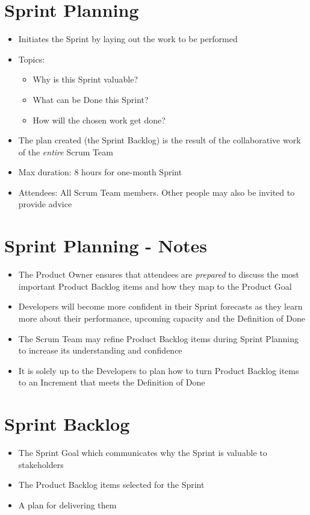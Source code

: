 \documentclass[a4paper,11pt,twocolumn]{article}
\begin{document}
\section*{Sprint Planning}
\begin{itemize}
	\item Initiates the Sprint by laying out the work to be performed
	\item Topics:
	      \begin{itemize}
	      	\item Why is this Sprint valuable?
	      	\item What can be Done this Sprint?
	      	\item How will the chosen work get done?
	      \end{itemize}
	\item The plan created (the Sprint Backlog) is the result of the collaborative work of the \textit{entire} Scrum Team
	\item Max duration: 8 hours for one-month Sprint
	\item Attendees: All Scrum Team members. Other people may also be invited to provide advice
\end{itemize}

\section*{Sprint Planning - Notes}
\begin{itemize}
	\item The Product Owner ensures that attendees are \textit{prepared} to discuss the most important Product Backlog items and how they map to the Product Goal
	\item Developers will become more confident in their Sprint forecasts as they learn more about their performance, upcoming capacity and the Definition of Done
	\item The Scrum Team may refine Product Backlog items during Sprint Planning to increase its understanding and confidence
	\item It is solely up to the Developers to plan how to turn Product Backlog items to an Increment that meets the Definition of Done
\end{itemize}

\section*{Sprint Backlog}
\begin{itemize}
	\item The Sprint Goal which communicates why the Sprint is valuable to stakeholders
	\item The Product Backlog items selected for the Sprint
	\item A plan for delivering them
\end{itemize}
\end{document}
